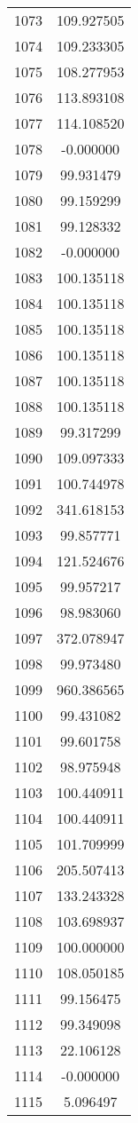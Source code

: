 \documentclass[12pt]{article}
\begin{document}
\begin{longtable}{@{}cc@{}}
1073 & 109.927505 \\
1074 & 109.233305 \\
1075 & 108.277953 \\
1076 & 113.893108 \\
1077 & 114.108520 \\
1078 & -0.000000 \\
1079 & 99.931479 \\
1080 & 99.159299 \\
1081 & 99.128332 \\
1082 & -0.000000 \\
1083 & 100.135118 \\
1084 & 100.135118 \\
1085 & 100.135118 \\
1086 & 100.135118 \\
1087 & 100.135118 \\
1088 & 100.135118 \\
1089 & 99.317299 \\
1090 & 109.097333 \\
1091 & 100.744978 \\
1092 & 341.618153 \\
1093 & 99.857771 \\
1094 & 121.524676 \\
1095 & 99.957217 \\
1096 & 98.983060 \\
1097 & 372.078947 \\
1098 & 99.973480 \\
1099 & 960.386565 \\
1100 & 99.431082 \\
1101 & 99.601758 \\
1102 & 98.975948 \\
1103 & 100.440911 \\
1104 & 100.440911 \\
1105 & 101.709999 \\
1106 & 205.507413 \\
1107 & 133.243328 \\
1108 & 103.698937 \\
1109 & 100.000000 \\
1110 & 108.050185 \\
1111 & 99.156475 \\
1112 & 99.349098 \\
1113 & 22.106128 \\
1114 & -0.000000 \\
1115 & 5.096497 \\

\end{longtable}
\end{document}

